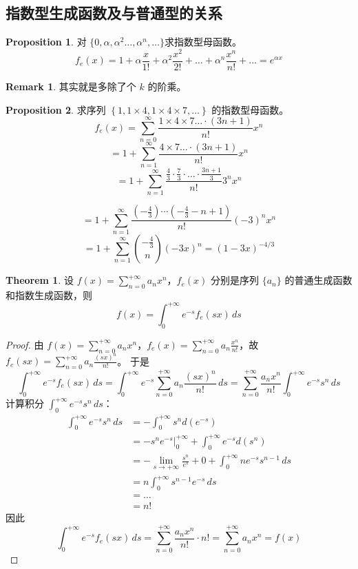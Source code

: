 \documentclass[oneside]{book}
\theoremstyle{definition}
\newtheorem{proposition}{Proposition}[section]
\newtheorem{theorem}{Theorem}[section]
\newtheorem{remark}{Remark}[section]
\begin{document}
	\subsection{指数型生成函数及与普通型的关系}
	
	\begin{proposition}对 \( \{0,\alpha,\alpha^2\dots,\alpha^n,\dots\}\)求指数型母函数。
		\[
		f_e(x) = 1 + \alpha \frac{x}{1!} + \alpha^2 \frac{x^2}{2!} + \dots + \alpha^n \frac{x^n}{n!} + \dots = e^{\alpha x}
		\]
	\end{proposition}
	\begin{remark}
		其实就是多除了个 \( k\) 的阶乘。
	\end{remark}
	
	\begin{proposition}
		求序列 \(\left\{1, 1 \times 4 , 1 \times 4 \times 7,   \dots\right\}\) 的指数型母函数。
		\[
		f_e(x) = \sum_{n=0}^{\infty} \frac{ 1 \times 4 \times 7  \dots \cdot (3n+1)}{n!} x^n
		\]
		\[
		= 1 +  \sum_{n=1}^{\infty} \frac{   4 \times 7  \dots \cdot (3n+1)}{n!} x^n
		\]
		\[
		= 1 + \sum_{n=1}^{\infty} \frac{\frac{4}{3} \cdot \frac{7}{3} \cdot \dots \cdot \frac{3n+1}{3}}{n!} 3^n x^n
		\]
	
		\[
		= 1 + \sum_{n=1}^{\infty} \frac{\left(-\frac{4}{3}\right) \cdots \left(-\frac{4}{3}-n+1\right)}{n!} (-3)^n x^n
		\]
		\[
		= 1 + \sum_{n=1}^{\infty} \binom{-\frac{4}{3}}{n} (-3x)^n = (1 - 3x)^{-4/3}
		\]
	\end{proposition}
\begin{theorem}
设 \( f(x) = \sum_{n=0}^{+\infty} a_n x^n \)，\( f_e(x) \) 分别是序列 \( \{a_n\} \) 的普通生成函数和指数生成函数，则
\[
f(x) = \int_0^{+\infty} e^{-s} f_e(sx) \, ds
\]
\begin{proof}
	由 \( f(x) = \sum_{n=0}^{+\infty} a_n x^n \)，\( f_e(x) = \sum_{n=0}^{+\infty} a_n \frac{x^n}{n!} \)，故 \( f_e(sx) = \sum_{n=0}^{+\infty} a_n \frac{(sx)^n}{n!} \)。
	于是
	\[
	\int_0^{+\infty} e^{-s} f_e(sx) \, ds = \int_0^{+\infty} e^{-s} \sum_{n=0}^{+\infty} a_n \frac{(sx)^n}{n!} \, ds = \sum_{n=0}^{+\infty} \frac{a_n x^n}{n!} \int_0^{+\infty} e^{-s} s^n \, ds
	\]
	计算积分 \( \int_0^{+\infty} e^{-s} s^n \, ds \)：
	\[
	\begin{aligned}
		\int_0^{+\infty} e^{-s} s^n \, ds &= -\int_0^{+\infty} s^n d(e^{-s}) \\
		&= -s^n e^{-s} \big|_0^{+\infty} + \int_0^{+\infty} e^{-s} d(s^n) \\
		&= -\lim_{s \to +\infty} \frac{s^n}{e^s} + 0 + \int_0^{+\infty} n e^{-s} s^{n-1} \, ds \\
		&= n \int_0^{+\infty} s^{n-1} e^{-s} \, ds \\
		&= \dots \\
		&= n!
	\end{aligned}
	\]
	因此
	\[
	\int_0^{+\infty} e^{-s} f_e(sx) \, ds = \sum_{n=0}^{+\infty} \frac{a_n x^n}{n!} \cdot n! = \sum_{n=0}^{+\infty} a_n x^n = f(x)
	\]
\end{proof}

\end{theorem}
\end{document}
